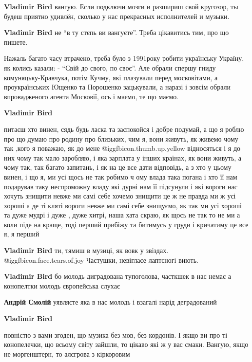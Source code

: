 \begin{itemize}
\begin{itemize}
\textbf{Vladimir Bird} вангую. Если подключи мозги и разшириш свой кругозор, ты будеш приятно удивлён, сколько у нас прекрасных исполнителей и музыки.

\textbf{Vladimir Bird} не \enquote{в ту стєпь ви вангуєте}. Треба цікавитись тим, про що пишете.


Нажаль багато часу втрачено, треба було з 1991року робити українську Україну, як
колись казали: - \enquote{Свій до свого, по своє}. Але обрали спершу гниду
комуняцьку-Кравчука, потім Кучму, які плазували перед московітами, а
проукраїнських Ющенко та Порошенко зацькували, а наразі і зовсім обрали
впровадженого агента Московії, ось і маємо, те що маємо.


\textbf{Vladimir Bird} 

питаєш хто винен, сядь будь ласка та заспокойся і добре подумай, а що я роблю
про що думаю про родину про близьких, чим я, вони живуть, як живемо чому так
,кого я поважаю, як до мене  @igg{fbicon.thumb.up.yellow}  відносяться і я до них чому так мало заробляю,
і яка зарплата у інших країнах, як вони живуть, а чому так, так багато
запитань, і як на це все дати відповідь, а з хто у цьому винен, і що я, ми
усі щось не так робимо ч ому влада така погана і хто її нам подарував таку
неспроможну владу які дурні нам її підсунули і які вороги нас хочуть знищити
невже ми самі себе хочемо знищити це ж не правда ми ж усі хороші а де ті кляті
вороги невже ми самі себе знищуємо, як так ми усі хороші та дуже мудрі і дуже
, дуже хитрі, наша хата скраю, як щось не так то не ми а коли піде на краще,
тоді перший прибіжу та битимусь у груди і кричатиму це все я, я перший

\textbf{Vladimir Bird} ти, тямиш в музиці, як вовк у звіздах. @igg{fbicon.face.tears.of.joy}  Частушки, невігласе лаптєногі виють.

\textbf{Vladimir Bird} бо молодь диградована тупоголова, часткшек в нас немає а конопелтки молодь європейська слухає

\textbf{Андрій Смолій} уявляєте яка в нас молодь і взагалі нарід деградований

\textbf{Vladimir Bird} 

повністю з вами згоден, що музика без мов, без кордонів. І якщо ви про ті
конопелечки, що всьому світу зайшли, то цікаво які ж у вас смаки. Вангую, якщо
не моргенштерн, то алєгрова з кіркоровим


\end{itemize}
\end{itemize}
